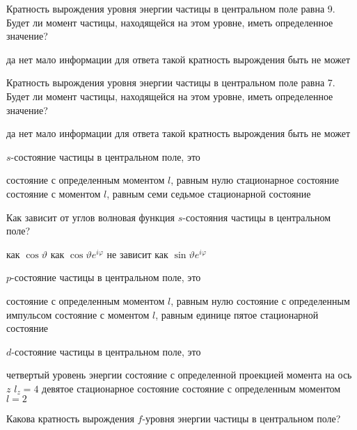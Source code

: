 \documentclass[11pt,a4paper]{exam}
\begin{document}
\begin{questions}
\question Кратность вырождения уровня энергии частицы в центральном поле равна 9. Будет ли момент частицы, находящейся на этом уровне, иметь определенное значение?
\begin{choices}
\choice да             
\choice нет
\choice мало информации для ответа 
\choice такой кратность вырождения быть не может 
\end{choices}

\question Кратность вырождения уровня энергии частицы в центральном поле равна 7. Будет ли момент частицы, находящейся на этом уровне, иметь определенное значение?
\begin{choices}
\choice да             
\choice нет
\choice мало информации для ответа 
\choice такой кратность вырождения быть не может
\end{choices}

\question $s$-состояние частицы в центральном поле, это 
\begin{choices}
\choice состояние с определенным моментом $l$, равным нулю
\choice стационарное состояние
\choice состояние с моментом $l$, равным семи  
\choice седьмое стационарной состояние
\end{choices}

\question Как зависит от углов волновая функция $s$-состояния частицы в центральном поле?
\begin{choices}
\choice как $\cos \vartheta $
\choice как $\cos \vartheta {e^{i\varphi }}$
\choice не зависит  
\choice как $\sin \vartheta {e^{i\varphi }}$
\end{choices}

\question $p$-состояние частицы в центральном поле, это 
\begin{choices}
\choice состояние с определенным моментом $l$, равным нулю
\choice состояние с определенным импульсом
\choice состояние с моментом $l$, равным единице  
\choice пятое стационарной состояние
\end{choices}

\question $d$-состояние частицы в центральном поле, это 
\begin{choices}
\choice четвертый уровень энергии
\choice состояние с определенной проекцией момента на ось $z$ ${l_z} = 4$
\choice девятое стационарное состояние
\choice состояние с определенным моментом $l = 2$
\end{choices}

\question Какова кратность вырождения $f$-уровня энергии частицы в центральном поле?
\begin{choices}
\end{choices}


\end{questions}
\end{document}
